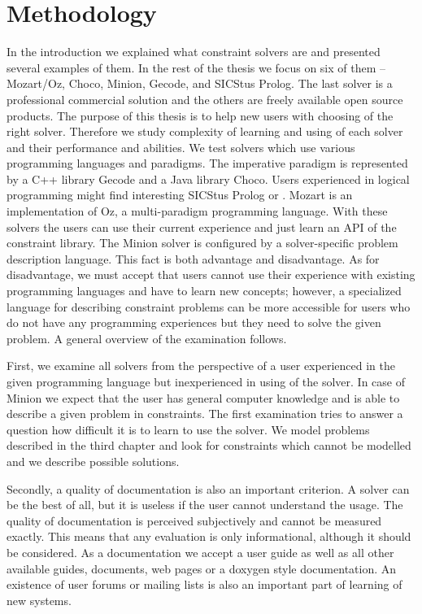 \chapter{Methodology}

In the introduction we explained what constraint solvers are and presented several 
examples of them. In the rest of the thesis we focus on six of them -- Mozart/Oz, 
Choco, Minion, Gecode, \eclipse and SICStus Prolog. The last solver is a 
professional commercial solution and the others are freely available open source 
products. The purpose of this thesis is to help new users with choosing of the right solver. 
Therefore we study complexity of learning and using of each solver and their 
performance and abilities. We test solvers which use various programming languages 
and paradigms. The imperative paradigm is represented by a C++ library Gecode and a Java 
library Choco. Users experienced in logical programming might find interesting 
SICStus Prolog or \eclipse. Mozart is an implementation of Oz, a multi-paradigm 
programming language. With these solvers the users can use their current experience and 
just learn an API of the constraint library. The Minion solver is configured by 
a solver-specific problem description language. This fact is both advantage and disadvantage. 
As for disadvantage, we must accept that users cannot use their experience with 
existing programming languages and have to learn new concepts; however, a specialized 
language for describing constraint problems can be more accessible for users who 
do not have any programming experiences but they need to solve the given problem.
A general overview of the examination follows.

First, we examine all solvers from the perspective of a user experienced in the given 
programming language but inexperienced in using of the solver. In case of Minion 
we expect that the user has general computer knowledge and is able 
to describe a given problem in constraints. The first examination tries to answer 
a question how difficult it is to learn to use the solver. We model problems 
described in the third chapter and look for constraints which cannot be modelled 
and we describe possible solutions. 

Secondly, a quality of documentation is also an important criterion. A solver can be 
the best of all, but it is useless if the user cannot understand the usage. 
The quality of documentation is perceived subjectively and cannot be measured 
exactly. This means that any evaluation is only informational, although it should be 
considered. As a documentation we accept a user guide as well as all other available 
guides, documents, web pages or a doxygen style documentation. An existence of user 
forums or mailing lists is also an important part of learning of new systems.


